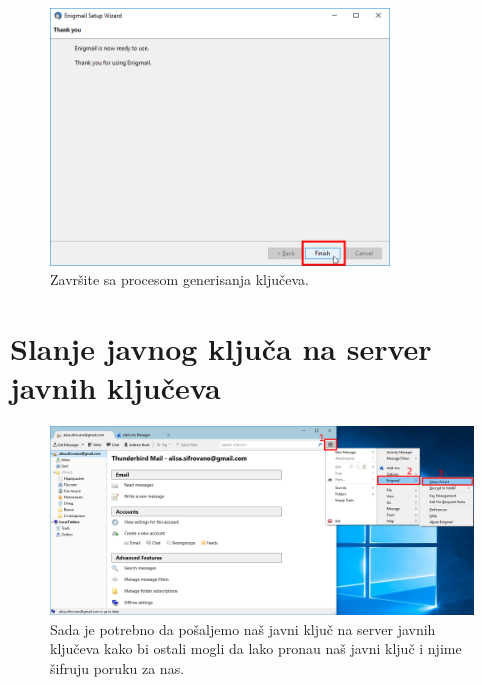 \documentclass[a4paper,11pt]{article}
\begin{document}
\begin{figure}[!h]
	\begin{center}
		\includegraphics[width=9cm]{43_Enigmail_Setup_Wizard.png}
		\caption{Zavr\v{s}ite sa procesom generisanja klju\v{c}eva.}
		\label{enigmail_setup_wizard10}
	\end{center}
\end{figure}
\newpage
\section{Slanje javnog klju\v{c}a na server javnih klju\v{c}eva}

\begin{figure}[!h]
	\begin{center}
		\includegraphics[width=\textwidth]{44_Enigmail_Setup_Wizard.png}
		\caption{Sada je potrebno da po\v{s}aljemo na\v{s} javni klju\v{c} na server javnih klju\v{c}eva kako bi ostali mogli da lako prona\dj{}u na\v{s} javni klju\v{c} i njime \v{s}ifruju poruku za nas.}
		\label{uploading_pubkey_enigmail}
	\end{center}
\end{figure}
\end{document}
